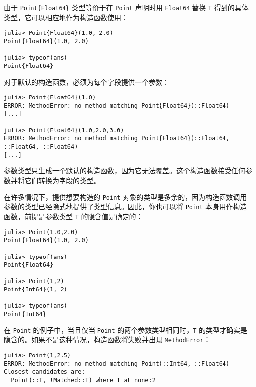 由于 \texttt{Point\{Float64\}} 类型等价于在 \texttt{Point} 声明时用 \hyperlink{5027751419500983000}{\texttt{Float64}} 替换 \texttt{T} 得到的具体类型，它可以相应地作为构造函数使用：




\begin{verbatim}
julia> Point{Float64}(1.0, 2.0)
Point{Float64}(1.0, 2.0)

julia> typeof(ans)
Point{Float64}
\end{verbatim}



对于默认的构造函数，必须为每个字段提供一个参数：




\begin{verbatim}
julia> Point{Float64}(1.0)
ERROR: MethodError: no method matching Point{Float64}(::Float64)
[...]

julia> Point{Float64}(1.0,2.0,3.0)
ERROR: MethodError: no method matching Point{Float64}(::Float64, ::Float64, ::Float64)
[...]
\end{verbatim}



参数类型只生成一个默认的构造函数，因为它无法覆盖。这个构造函数接受任何参数并将它们转换为字段的类型。



在许多情况下，提供想要构造的 \texttt{Point} 对象的类型是多余的，因为构造函数调用参数的类型已经隐式地提供了类型信息。因此，你也可以将 \texttt{Point} 本身用作构造函数，前提是参数类型 \texttt{T} 的隐含值是确定的：




\begin{verbatim}
julia> Point(1.0,2.0)
Point{Float64}(1.0, 2.0)

julia> typeof(ans)
Point{Float64}

julia> Point(1,2)
Point{Int64}(1, 2)

julia> typeof(ans)
Point{Int64}
\end{verbatim}



在 \texttt{Point} 的例子中，当且仅当 \texttt{Point} 的两个参数类型相同时，\texttt{T} 的类型才确实是隐含的。如果不是这种情况，构造函数将失败并出现 \hyperlink{68769522931907606}{\texttt{MethodError}}：




\begin{verbatim}
julia> Point(1,2.5)
ERROR: MethodError: no method matching Point(::Int64, ::Float64)
Closest candidates are:
  Point(::T, !Matched::T) where T at none:2
\end{verbatim}



